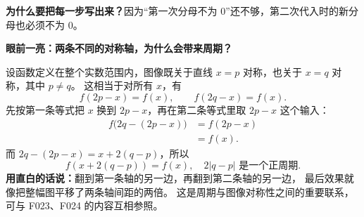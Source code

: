 \begin{proofbox}
\textbf{为什么要把每一步写出来？}因为“第一次分母不为 $0$”还不够，第二次代入时的新分母也必须不为 $0$。

\end{proofbox}\clearpage\begin{proofbox}\textbf{眼前一亮：两条不同的对称轴，为什么会带来周期？}



设函数定义在整个实数范围内，图像既关于直线 $x=p$ 对称，也关于 $x=q$ 对称，其中 $p\ne q$。
这相当于对所有 $x$，有
\[
 f(2p-x)=f(x),\qquad f(2q-x)=f(x).
\]
先按第一条等式把 $x$ 换到 $2p-x$，再在第二条等式里取 $2p-x$ 这个输入：
\[
\begin{aligned}
 f\bigl(2q-(2p-x)\bigr)
 &=f(2p-x)\\&=f(x).
\end{aligned}
\]
而 $2q-(2p-x)=x+2(q-p)$，所以
\[
 \boxed{f(x+2(q-p))=f(x),\quad 2|q-p|\text{ 是一个正周期}.}
\]
\textbf{用直白的话说：}翻到第一条轴的另一边，再翻到第二条轴的另一边，
最后效果就像把整幅图平移了两条轴间距的两倍。
这是周期与图像对称性之间的重要联系，可与 F023、F024 的内容互相参照。
\end{proofbox}
